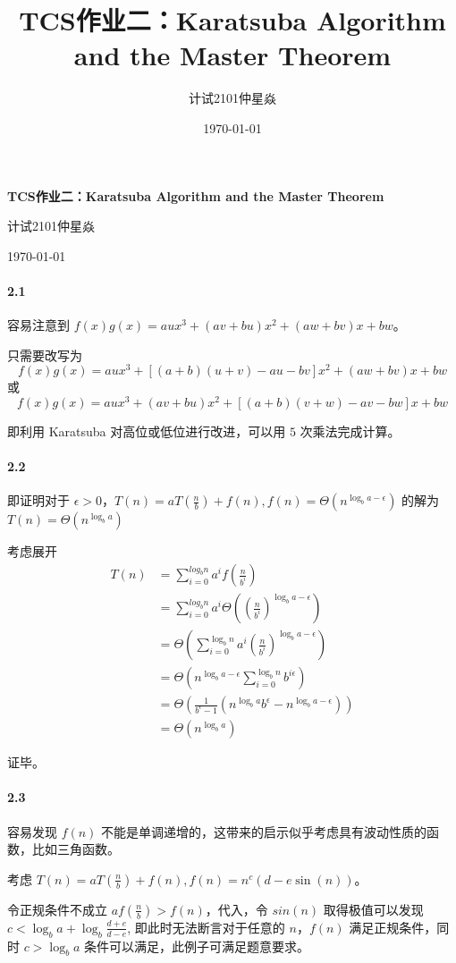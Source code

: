 \documentclass[12pt, a4paper, oneside]{ctexart}
\title{\textbf{TCS作业二：Karatsuba Algorithm and the Master Theorem}}
\author{计试2101仲星焱}
\date{\today}
\begin{document}
	\textbf{TCS作业二：Karatsuba Algorithm and the Master Theorem}
	
	计试2101仲星焱
	
	\today
	
	\paragraph{2.1}
	
	容易注意到 $f(x)g(x) = aux^3+(av+bu)x^2+(aw+bv)x+bw$。
	
	只需要改写为 $$f(x)g(x)= aux^3+[(a+b)(u+v)-au-bv]x^2+(aw+bv)x+bw$$ 或 $$f(x)g(x) = aux^3+(av+bu)x^2+[(a+b)(v+w)-av-bw]x+bw$$

	即利用 Karatsuba 对高位或低位进行改进，可以用 $5$ 次乘法完成计算。
	
	\paragraph{2.2}
	即证明对于 $\epsilon > 0$，$T(n) = aT(\frac  n b) + f(n), f(n) = \Theta(n^{\log_ba - \epsilon})$ 的解为 $T(n) = \Theta(n^{\log_ba})$
	
	考虑展开 $$\begin{aligned}
		T(n)&=\sum_{i=0}^{log_b n}a^if(\frac n {b^i})\\
		&=\sum_{i=0}^{log_b n}a^i\Theta((\frac{n}{b^i})^{\log_b a - \epsilon})\\
		&=\Theta( \sum_{i=0}^{\log_b n} a^i(\frac{n}{b^i})^{\log_b a -\epsilon} )\\
		&=\Theta(n^{\log_b a -\epsilon}\sum_{i=0}^{\log_b n}b^{i\epsilon})\\
		&=\Theta(\frac{1}{b^\epsilon - 1}(n^{\log_b a}b^\epsilon-n^{\log_b a -\epsilon}))\\
		&=\Theta(n^{\log_b a})
	\end{aligned}$$
	
	证毕。
	
	\paragraph{2.3}
	
	容易发现 $f(n)$ 不能是单调递增的，这带来的启示似乎考虑具有波动性质的函数，比如三角函数。
	
	考虑 $T(n)=aT(\frac{n} b) +f(n), f(n)=n^c(d-e\sin(n))$。
	
	令正规条件不成立 $af(\frac{n} b) > f(n)$，代入，令 $sin(n)$ 取得极值可以发现 $c < \log_b a + \log_b\frac{d+e}{d-e}$, 即此时无法断言对于任意的 $n$，$f(n)$ 满足正规条件，同时 $c > \log_b a$ 条件可以满足，此例子可满足题意要求。
	
\end{document}

